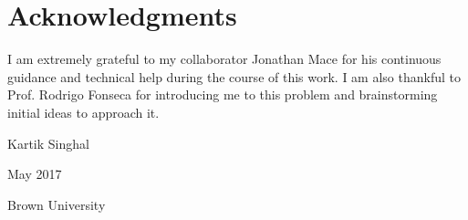 \cleardoublepage
{}
{}
\chapter*{Acknowledgments}
\vspace{0.5in}
I am extremely grateful to my collaborator Jonathan Mace for his continuous guidance and technical help during the course of this work. I am also thankful to Prof. Rodrigo Fonseca for introducing me to this problem and brainstorming initial ideas to approach it.
\vspace{0.5in}

Kartik Singhal
\vspace{0.2in}

May 2017

Brown University

\newpage
